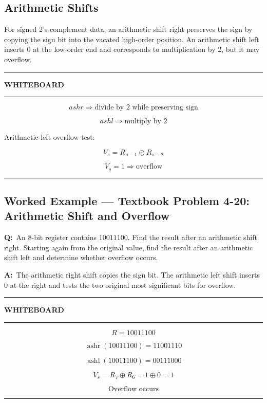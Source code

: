 \documentclass[11pt]{article}
\newenvironment{whiteboard}
{
    \par\medskip
    \hrule
    \vspace{0.35em}
    \noindent\textbf{\large WHITEBOARD}
    \par\vspace{0.3em}
    \hrule
    \vspace{0.65em}
}
{
    \vspace{0.45em}
    \hrule
    \par\medskip
}
\newcommand{\Q}{\par\noindent\textbf{Q:}\ }
\newcommand{\A}{\par\noindent\textbf{A:}\ }
\newcommand{\worked}[1]{%
    \subsection*{Worked Example --- #1}
}
\begin{document}
\subsection{Arithmetic Shifts}

For signed 2's-complement data, an arithmetic shift right preserves the sign by copying the sign bit into the vacated high-order position. An arithmetic shift left inserts 0 at the low-order end and corresponds to multiplication by 2, but it may overflow.

\begin{whiteboard}

\[
\boxed{ashr\Rightarrow\text{divide by }2\text{ while preserving sign}}
\]

\[
\boxed{ashl\Rightarrow\text{multiply by }2}
\]

Arithmetic-left overflow test:

\[
\boxed{V_s=R_{n-1}\oplus R_{n-2}}
\]

\[
V_s=1\Rightarrow\boxed{\text{overflow}}
\]

\end{whiteboard}

\worked{Textbook Problem 4-20: Arithmetic Shift and Overflow}

\Q An 8-bit register contains $10011100$. Find the result after an arithmetic shift right. Starting again from the original value, find the result after an arithmetic shift left and determine whether overflow occurs.

\A The arithmetic right shift copies the sign bit. The arithmetic left shift inserts 0 at the right and tests the two original most significant bits for overflow.

\begin{whiteboard}

\[
R=10011100
\]

\[
\operatorname{ashr}(10011100)=\boxed{11001110}
\]

\[
\operatorname{ashl}(10011100)=\boxed{00111000}
\]

\[
V_s=R_7\oplus R_6=1\oplus0=1
\]

\[
\boxed{\text{Overflow occurs}}
\]

\end{whiteboard}

\end{document}
